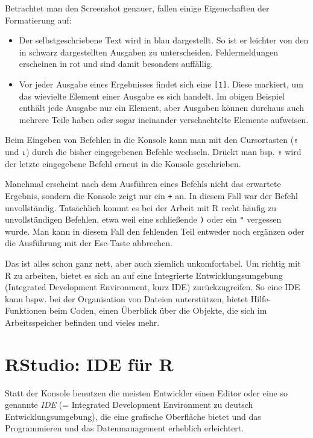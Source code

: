 \documentclass[
]{book}
\begin{document}
Betrachtet man den Screenshot genauer, fallen einige Eigenschaften der Formatierung auf:

\begin{itemize}
\item
  Der selbstgeschriebene Text wird in blau dargestellt. So ist er leichter von den in schwarz dargestellten Ausgaben zu unterscheiden. Fehlermeldungen erscheinen in rot und sind damit besonders auffällig.
\item
  Vor jeder Ausgabe eines Ergebnisses findet sich eine \texttt{{[}1{]}}. Diese markiert, um das wievielte Element einer Ausgabe es sich handelt.
  Im obigen Beispiel enthält jede Ausgabe nur ein Element, aber Ausgaben können durchaus auch mehrere Teile haben oder sogar ineinander verschachtelte Elemente aufweisen.
\end{itemize}

Beim Eingeben von Befehlen in die Konsole kann man mit den Cursortasten (\texttt{↑} und \texttt{↓}) durch die bisher eingegebenen Befehle wechseln. Drückt man bsp. \texttt{↑} wird der letzte eingegebene Befehl erneut in die Konsole geschrieben.

Manchmal erscheint nach dem Ausführen eines Befehls nicht das erwartete Ergebnis, sondern die Konsole zeigt nur ein \texttt{+} an. In diesem Fall war der Befehl unvollständig. Tatsächlich kommt es bei der Arbeit mit R recht häufig zu unvollständigen Befehlen, etwa weil eine schließende \texttt{)} oder ein \texttt{"} vergessen wurde. Man kann in diesem Fall den fehlenden Teil entweder noch ergänzen oder die Ausführung mit der Esc-Taste abbrechen.

Das ist alles schon ganz nett, aber auch ziemlich unkomfortabel. Um richtig mit R zu arbeiten, bietet es sich an auf eine Integrierte Entwicklungsumgebung (Integrated Development Environment, kurz IDE) zurückzugreifen.
So eine IDE kann bspw. bei der Organisation von Dateien unterstützen, bietet Hilfe-Funktionen beim Coden, einen Überblick über die Objekte, die sich im Arbeitsspeicher befinden und vieles mehr.

\hypertarget{rstudio-ide-fuxfcr-r}{%
\section{RStudio: IDE für R}\label{rstudio-ide-fuxfcr-r}}

Statt der Konsole benutzen die meisten Entwickler einen Editor oder eine so genannte \emph{IDE} (= Integrated Development Environment zu deutsch Entwicklungsumgebung), die eine grafische Oberfläche bietet und das Programmieren und das Datenmanagement erheblich erleichtert.
\end{document}
